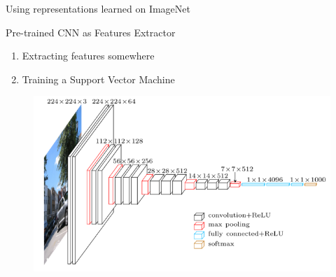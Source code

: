 \begin{frame}{Using representations learned on ImageNet}
	
	\begin{block}{\small Pre-trained CNN as Features Extractor}
		\vspace{-.2cm}
	\begin{enumerate}
		\item Extracting features somewhere
		\item Training a Support Vector Machine
	\end{enumerate}
	\end{block}
	
		\vspace{-.4cm}
	
	\begin{figure}[h]
		\centering
		\includegraphics[width=.84\linewidth]{images/vgg16.png}
	\end{figure}

\end{frame}


